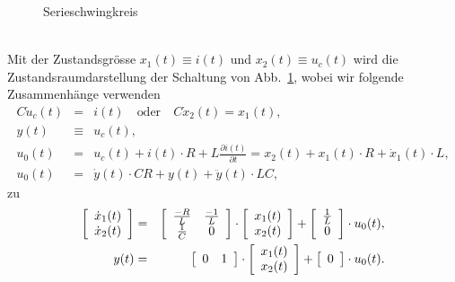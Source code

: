 \begin{figure}[!htb]
  \vspace*{-6mm}\begin{center}
    \vspace*{-3mm}\caption{Serieschwingkreis}\label{ZVD_ABB_003}
\end{center}
\vspace*{-6mm}
\end{figure}\\
\nit Mit der Zustandsgr\"osse $x_1(t)\equiv i(t)$ und $x_2(t)\equiv u_c(t)$  wird die  Zustandsraumdarstellung der Schaltung von Abb.~\ref{ZVD_ABB_003}, wobei wir folgende Zusammenh\"ange verwenden
\begin{eqnarray}
  C\dot{u}_c(t)&=&i(t)\quad\text{oder}\quad C\dot{x}_2(t)=x_1(t),\nonumber \\
 y(t)&\equiv& u_c(t),\nonumber\\
 u_0(t)&=&u_c(t)+i(t)\cdot R+L\frac{\partial i(t)}{\partial t}=x_2(t)+x_1(t)\cdot R + \dot{x}_1(t)\cdot L,\nonumber\\
 u_0(t)&=&\dot{y}(t)\cdot CR + y(t) +\ddot{y}(t)\cdot LC,\label{ZVD_RES_001}
\end{eqnarray}
  zu
\begin{eqnarray*}
\left [ 
\begin{array}{c}
\dot{x}_1(t)\\
\dot{x}_2(t)\\
\end{array}
\right ] &=&
\left [ 
\begin{array}{c c}
\frac{-R}{L} & \frac{-1}{L}\\
\frac{1}{C} & 0\\
\end{array}
\right ]\cdot
\left [ 
\begin{array}{c}
x_1(t)\\
x_2(t)\\
\end{array}
\right ]+
\left [ 
\begin{array}{c}
\frac{1}{L}\\
0\\
\end{array}
\right ]\cdot
u_0(t),\\
y(t) &= &
\left [ 
\begin{array}{c c}
0 & 1\\
\end{array}
\right ] \cdot
\left [ 
\begin{array}{c}
x_1(t)\\
x_2(t)\\
\end{array}
\right ]+
\left [ 
\begin{array}{c}
0 \\
\end{array}
\right ] \cdot
u_0(t).
\end{eqnarray*}
